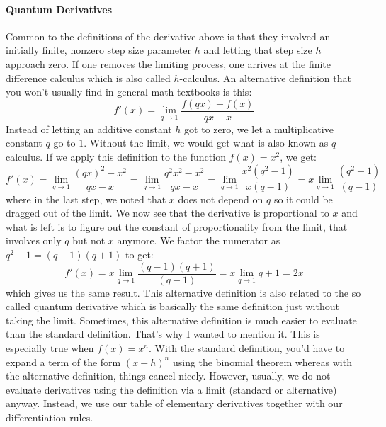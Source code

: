 \paragraph{Quantum Derivatives}
Common to the definitions of the derivative above is that they involved an initially finite, nonzero step size parameter $h$ and letting that step size $h$ approach zero. If one removes the limiting process, one arrives at the finite difference calculus which is also called $h$-calculus. An alternative definition that you won't usually find in general math textbooks is this:
\begin{equation}
 f'(x) = \lim_{q \rightarrow 1} \frac{f(q x) - f(x)}{ q x - x }
\end{equation}
Instead of letting an additive constant $h$ got to zero, we let a multiplicative constant $q$ go to $1$. Without the limit, we would get what is also known as $q$-calculus. If we apply this definition to the function $f(x) = x^2$, we get:
\begin{equation}
f'(x) = \lim_{q \rightarrow 1} \frac{(q x)^2 - x^2}{ q x - x }
      = \lim_{q \rightarrow 1} \frac{q^2 x^2 - x^2}{ q x - x }
      = \lim_{q \rightarrow 1} \frac{x^2 (q^2 - 1)}{ x (q - 1)}
      = x \lim_{q \rightarrow 1} \frac{(q^2 - 1)}{(q - 1)}         
\end{equation}
where in the last step, we noted that $x$ does not depend on $q$ so it could be dragged out of the limit. We now see that the derivative is proportional to $x$ and what is left is to figure out the constant of proportionality from the limit, that involves only $q$ but not $x$ anymore. We factor the numerator as $q^2 - 1 = (q-1)(q+1)$ to get:
\begin{equation}
f'(x) = x \lim_{q \rightarrow 1} \frac{(q-1)(q+1)}{(q - 1)}     
      = x \lim_{q \rightarrow 1} q+1
      = 2 x
\end{equation}
which gives us the same result. This alternative definition is also related to the so called quantum derivative which is basically the same definition just without taking the limit. Sometimes, this alternative definition is much easier to evaluate than the standard definition. That's why I wanted to mention it. This is especially true when $f(x) = x^n$. With the standard definition, you'd have to expand a term of the form $(x+h)^n$ using the binomial theorem whereas with the alternative definition, things cancel nicely. However, usually, we do not evaluate derivatives using the definition via a limit (standard or alternative) anyway. Instead, we use our table of elementary derivatives together with our differentiation rules.

